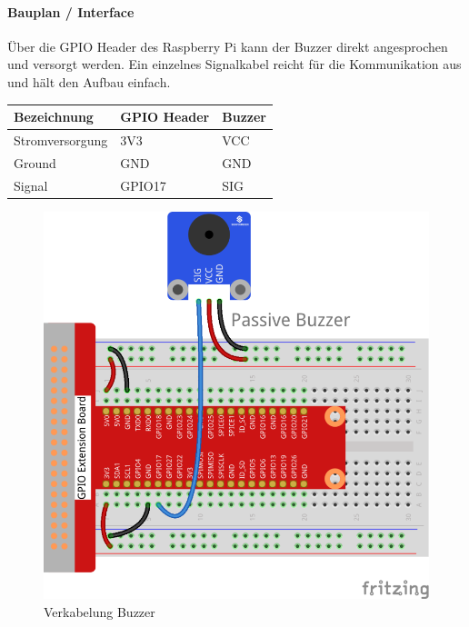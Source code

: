 \documentclass[../../main.tex]{subfiles}
\begin{document}
\paragraph{Bauplan / Interface}

Über die GPIO Header des Raspberry Pi kann der Buzzer direkt angesprochen und versorgt werden. Ein einzelnes Signalkabel reicht für die Kommunikation aus und hält den Aufbau einfach.

\begin{table}[H]
\begin{center}
\begin{tabular}{lll}
\hline
Bezeichnung     & GPIO Header & Buzzer \\ \hline
Stromversorgung & 3V3      & VCC    \\ \hline
Ground          & GND      & GND    \\ \hline
Signal          & GPIO17   & SIG    \\ \hline
\end{tabular}
\end{center}
\end{table}

\begin{figure}[H] \centering
  \includegraphics{VerkabelungAkustik}
  \caption{Verkabelung Buzzer}
  \label{fig:Buzzer}
\end{figure}
\end{document}
